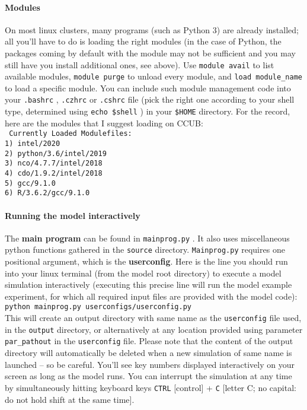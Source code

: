 \documentclass[a4paper, 11pt]{article}
\newcommand\code[1]{%
\texttt{#1}%
}
\begin{document}
\paragraph{Modules} On most linux clusters, many programs (such as Python 3) are already installed; all you'll have to do is loading the right modules (in the case of Python, the packages coming by default with the module may not be sufficient and you may still have you install additional ones, see above). Use \code{module avail} to list available modules, \code{module purge} to unload every module, and \code{load module\_name} to load a specific module. You can include such module management code into your \code{.bashrc}, \code{.czhrc} or \code{.cshrc} file (pick the right one according to your shell type, determined using \code{echo \$shell}) in your \code{\$HOME} directory. For the record, here are the modules that I suggest loading on CCUB:\\ 

\code{
Currently Loaded Modulefiles:\\
 1) intel/2020\\
 2) python/3.6/intel/2019\\   
 3) nco/4.7.7/intel/2018\\
 4) cdo/1.9.2/intel/2018\\
 5) gcc/9.1.0\\   
 6) R/3.6.2/gcc/9.1.0
}

\paragraph{Running the model interactively} The \textbf{main program} can be found in \code{mainprog.py}. It also uses miscellaneous python functions gathered in the \code{source} directory. \code{Mainprog.py} requires one positional argument, which is the \textbf{userconfig}. Here is the line you should run into your linux terminal (from the model root directory) to execute a model simulation interactively (executing this precise line will run the model example experiment, for which all required input files are provided with the model code):\\

\code{python mainprog.py userconfigs/userconfig.py}\\

This will create an output directory with same name as the \code{userconfig} file used, in the \code{output} directory, or alternatively at any location provided using parameter \code{par\_pathout} in the \code{userconfig} file. Please note that the content of the output directory will automatically be deleted when a new simulation of same name is launched -- so be careful. You'll see key numbers displayed interactively on your screen as long as the model runs. You can interrupt the simulation at any time by simultaneously hitting keyboard keys \code{CTRL} [control] + \code{C} [letter C; no capital: do not hold shift at the same time].\\
\end{document}
